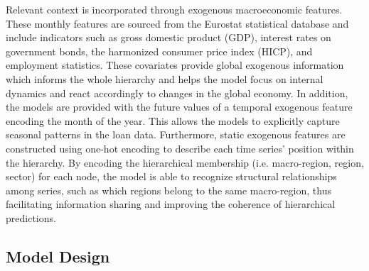 \documentclass[letterpaper]{article}
\begin{document}
Relevant context is incorporated through exogenous macroeconomic features. These monthly features are sourced from the Eurostat statistical database and include indicators such as gross domestic product (GDP), interest rates on government bonds, the harmonized consumer price index (HICP), and employment statistics. These covariates provide global exogenous information which informs the whole hierarchy and helps the model focus on internal dynamics and react accordingly to changes in the global economy. In addition, the models are provided with the future values of a temporal exogenous feature encoding the month of the year. This allows the models to explicitly capture seasonal patterns in the loan data. Furthermore, static exogenous features are constructed using one-hot encoding to describe each time series' position within the hierarchy. By encoding the hierarchical membership (i.e. macro-region, region, sector) for each node, the model is able to recognize structural relationships among series, such as which regions belong to the same macro-region, thus facilitating information sharing and improving the coherence of hierarchical predictions.

\subsection{Model Design}
\end{document}
